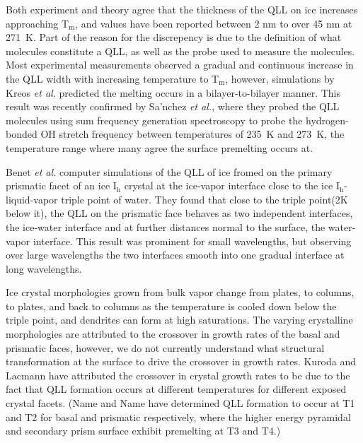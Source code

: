 Both experiment and theory agree that the thickness of the QLL on ice
increases approaching T$_\mathrm{m}$, and values have been reported
between 2 nm to over 45 nm at 271~K. Part of the reason for the
discrepency is due to the definition of what molecules constitute a
QLL, as well as the probe used to measure the molecules. Most
experimental measurements observed a gradual and continuous increase
in the QLL width with increasing temperature to T$_\mathrm{m}$,
however, simulations by Kreos \textit{et al.} predicted the melting
occurs in a bilayer-to-bilayer manner. This result was recently
confirmed by Sa'nchez \textit{et al.}, where they probed the QLL
molecules using sum frequency generation spectroscopy to probe the
hydrogen-bonded OH stretch frequency between temperatures of 235~K
and 273~K, the temperature range where many agree the surface
premelting occurs at.

Benet \textit{et al.} computer simulations of the QLL of ice fromed on
the primary prismatic facet of an ice I$_\mathrm{h}$ crystal at the
ice-vapor interface close to the ice I$_\mathrm{h}$-liquid-vapor
triple point of water.\cite{Benet2016} They found that close to the
triple point(2K below it), the QLL on the prismatic face behaves as
two independent interfaces, the ice-water interface and at further
distances normal to the surface, the water-vapor interface. This
result was prominent for small wavelengths, but observing over large
wavelengths the two interfaces smooth into one gradual interface at
long wavelengths.

Ice crystal morphologies grown from bulk vapor change from plates, to
columns, to plates, and back to columns as the temperature is cooled
down below the triple point, and dendrites can form at high
saturations.\cite{K. G. Libbrecht, Rep. Prog. Phys. 68, 855 (2005).}
The varying crystalline morphologies are attributed to the crossover
in growth rates of the basal and prismatic faces, however, we do not
currently understand what structural transformation at the surface to
drive the crossover in growth rates.\cite{1,2,4,5} Kuroda and Lacmann
have attributed the crossover in crystal growth rates to be due to the
fact that QLL formation occurs at different temperatures for different
exposed crystal facets.\cite{6} (Name and Name have determined QLL
formation to occur at T1 and T2 for basal and prismatic respectively,
where the higher energy pyramidal and secondary prism surface exhibit
premelting at T3 and T4.)

